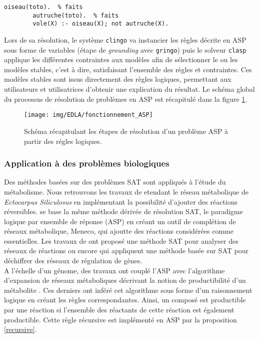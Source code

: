 \documentclass[../main.tex]{subfiles}
\begin{document}
\begin{lstlisting}[mathescape=True,label={exemple2},caption={Code ASP permettant de calculer le scope métabolique},captionpos=b]
    	oiseau(toto).  % faits 
    	autruche(toto).  % faits
    	vole(X) :- oiseau(X); not autruche(X).
\end{lstlisting}

Lors de sa résolution, le système \texttt{clingo} va instancier les règles décrite en ASP sous forme de variables (étape de \textit{grounding} avec \texttt{gringo}) puis le solveur \texttt{clasp} applique les différentes contraintes aux modèles afin de sélectionner le ou les modèles stables, c'est à dire, satisfaisant l'ensemble des règles et contraintes. Ces modèles stables sont issus directement des règles logiques, permettant aux utilisateurs et utilisatrices d'obtenir une explication du résultat. Le schéma global du processus de résolution de problèmes en ASP est récapitulé dans la figure \ref{fig:asp}.

\begin{figure}[h!]
    \centering
    \texttt{[image: img/EDLA/fonctionnement\_ASP]}
    \caption{Schéma récapitulant les étapes de résolution d'un problème ASP à partir des régles logiques.}
    \label{fig:asp}
\end{figure}

\subsubsection{Application à des problèmes biologiques}

Des méthodes basées sur des problèmes SAT sont appliqués à l'étude du métabolisme. Nous retrouvons les travaux de \citep{Collet2013} etendant le réseau métabolique de \textit{Ectocarpus Siliculosus} en implémentant la possibilité d'ajouter des réactions réversibles. \citep{Prigent2017} se base la même méthode dérivée de résolution SAT, le paradigme logique par ensemble de réponse (ASP) en créant un outil de complétion de réseaux métabolique, Meneco, qui ajoutte des réactions considérées comme essentielles. Les travaux de \citep{Tiwari2007} ont proposé une méthode SAT pour analyser des réseaux de réactions ou encore \citep{Corblin2006} qui appliquent une méthode basée sur SAT pour déchiffrer des réseaux de régulation de gènes.\\

A l'échelle d'un génome, des travaux ont couplé l'ASP avec l'algorithme d'expansion de réseaux métaboliques \citep{Ebenhoh2004} décrivant la notion de productibilité d'un métabolite \citep{Frioux2018,Aite2018}. Ces derniers ont inféré cet algorithme sous forme d'un raisonnement logique \citep{Levesque1986} en créant les règles correspondantes. Ainsi, un composé est productible par une réaction si l'ensemble des réactants de cette réaction est également productible. Cette règle récursive est implémenté en ASP par la proposition \ref{recursive}.
\end{document}
